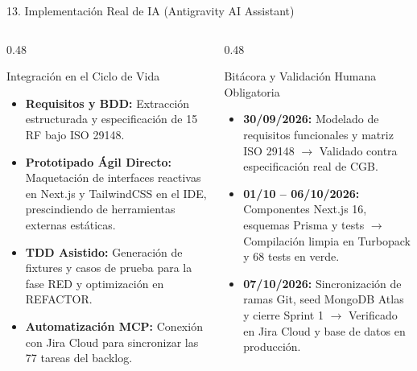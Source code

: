 \documentclass[aspectratio=169, 10pt, spanish]{beamer}
\begin{document}
\begin{frame}{13. Implementación Real de IA (Antigravity AI Assistant)}
\begin{columns}[T]
    \begin{column}{0.48\textwidth}
        \begin{academicbox}{Integración en el Ciclo de Vida}
            \scriptsize
            \begin{itemize}
                \item \textbf{Requisitos y BDD:} Extracción estructurada y especificación de 15 RF bajo ISO 29148.
                \item \textbf{Prototipado Ágil Directo:} Maquetación de interfaces reactivas en Next.js y TailwindCSS en el IDE, prescindiendo de herramientas externas estáticas.
                \item \textbf{TDD Asistido:} Generación de fixtures y casos de prueba para la fase RED y optimización en REFACTOR.
                \item \textbf{Automatización MCP:} Conexión con Jira Cloud para sincronizar las 77 tareas del backlog.
            \end{itemize}
        \end{academicbox}
    \end{column}
    \begin{column}{0.48\textwidth}
        \begin{formalbox}{Bitácora y Validación Humana Obligatoria}
            \tiny
            \begin{itemize}
                \item \textbf{30/09/2026:} Modelado de requisitos funcionales y matriz ISO 29148 $\rightarrow$ Validado contra especificación real de CGB.
                \item \textbf{01/10 -- 06/10/2026:} Componentes Next.js 16, esquemas Prisma y tests $\rightarrow$ Compilación limpia en Turbopack y 68 tests en verde.
                \item \textbf{07/10/2026:} Sincronización de ramas Git, seed MongoDB Atlas y cierre Sprint 1 $\rightarrow$ Verificado en Jira Cloud y base de datos en producción.
            \end{itemize}
        \end{formalbox}
    \end{column}
\end{columns}
\end{frame}
\end{document}
